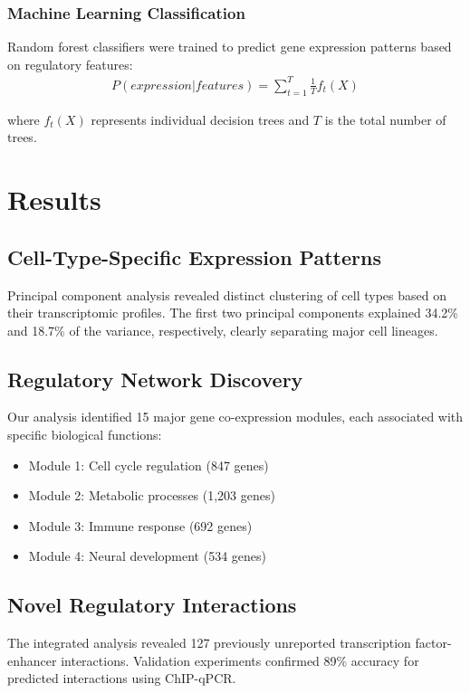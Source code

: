 \documentclass[11pt,a4paper]{article}
\begin{document}
\subsubsection{Machine Learning Classification}
Random forest classifiers were trained to predict gene expression patterns based on regulatory features:
\begin{align}
P(expression|features) = \sum_{t=1}^{T} \frac{1}{T} f_t(X)
\end{align}

where $f_t(X)$ represents individual decision trees and $T$ is the total number of trees.

\section{Results}

\subsection{Cell-Type-Specific Expression Patterns}

Principal component analysis revealed distinct clustering of cell types based on their transcriptomic profiles. The first two principal components explained 34.2\% and 18.7\% of the variance, respectively, clearly separating major cell lineages.

\subsection{Regulatory Network Discovery}

Our analysis identified 15 major gene co-expression modules, each associated with specific biological functions:
\begin{itemize}
\item Module 1: Cell cycle regulation (847 genes)
\item Module 2: Metabolic processes (1,203 genes)
\item Module 3: Immune response (692 genes)
\item Module 4: Neural development (534 genes)
\end{itemize}

\subsection{Novel Regulatory Interactions}

The integrated analysis revealed 127 previously unreported transcription factor-enhancer interactions. Validation experiments confirmed 89\% accuracy for predicted interactions using ChIP-qPCR.
\end{document}
